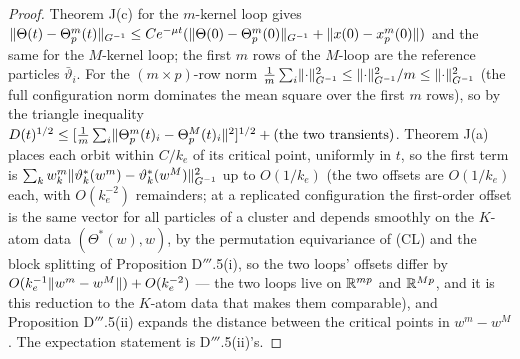 
\begin{proof}
Theorem J(c) for the $m$-kernel loop gives
$\lVert \Theta(t) - \Theta_p^m(t)\rVert_{G^{-1}}\le Ce^{-\mu t}(\lVert \Theta(0) - \Theta_p^m(0)\rVert_{G^{-1}} + \lVert x(0) - x_p^m(0)\rVert)$
and the same for the $M$-kernel loop; the first $m$ rows of the $M$-loop are the reference particles
$\bar\vartheta_i$. For the $(m\times p)$-row norm
$\frac1m\sum_i\lVert \cdot\rVert^2_{G^{-1}}\le\lVert \cdot\rVert^2_{G^{-1}}/m\le\lVert \cdot\rVert^2_{G^{-1}}$ (the full configuration
norm dominates the mean square over the first $m$ rows), so by the triangle inequality
$D(t)^{1/2}\le[\frac1m\sum_i\lVert \Theta_p^m(t)_i - \Theta_p^M(t)_i\rVert^2]^{1/2} + (\text{the two transients})$.
Theorem J(a) places each orbit within $C/k_e$ of its critical point, uniformly in $t$, so the first term is
$\sum_kw^m_k\lVert \vartheta^*_k(w^m) - \vartheta^*_k(w^M)\rVert^2_{G^{-1}}$ up to $O(1/k_e)$ (the two offsets are
$O(1/k_e)$ each, with $O(k_e^{-2})$ remainders; at a replicated configuration the first-order offset is the same
vector for all particles of a cluster and depends smoothly on the $K$-atom data $(\Theta^*(w),w)$, by the permutation
equivariance of \textup{(CL)} and the block splitting of Proposition D$'''$.5(i), so the two loops' offsets differ by
$O(k_e^{-1}\lVert w^m - w^M\rVert) + O(k_e^{-2})$ --- the two loops live on $\mathbb{R}^{mp}$ and $\mathbb{R}^{Mp}$, and it is this
reduction to the $K$-atom data that makes them comparable), and Proposition D$'''$.5(ii) expands the distance between
the critical points in $w^m - w^M$. The expectation statement is D$'''$.5(ii)'s.
\end{proof}

